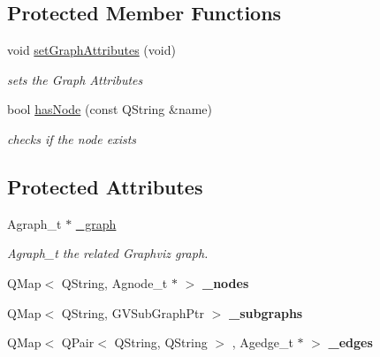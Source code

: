 \subsection*{\-Protected \-Member \-Functions}
\begin{DoxyCompactItemize}
\item 
\hypertarget{class_g_v_sub_graph_a6f94775bfde0ef47c59df8a7e6510aaf}{void \hyperlink{class_g_v_sub_graph_a6f94775bfde0ef47c59df8a7e6510aaf}{set\-Graph\-Attributes} (void)}\label{class_g_v_sub_graph_a6f94775bfde0ef47c59df8a7e6510aaf}

\begin{DoxyCompactList}\small\item\em sets the \-Graph \-Attributes \end{DoxyCompactList}\item 
bool \hyperlink{class_g_v_sub_graph_af55511f05fe4d65e122cc77c2d02a706}{has\-Node} (const \-Q\-String \&name)
\begin{DoxyCompactList}\small\item\em checks if the node exists \end{DoxyCompactList}\end{DoxyCompactItemize}
\subsection*{\-Protected \-Attributes}
\begin{DoxyCompactItemize}
\item 
\hypertarget{class_g_v_sub_graph_ae9ba380851ecbc611bbe9cd2980ba152}{\-Agraph\-\_\-t $\ast$ \hyperlink{class_g_v_sub_graph_ae9ba380851ecbc611bbe9cd2980ba152}{\-\_\-graph}}\label{class_g_v_sub_graph_ae9ba380851ecbc611bbe9cd2980ba152}

\begin{DoxyCompactList}\small\item\em \-Agraph\-\_\-t the related \-Graphviz graph. \end{DoxyCompactList}\item 
\hypertarget{class_g_v_sub_graph_ab994dac998f44c0566567d9cf28c5aae}{\-Q\-Map$<$ \-Q\-String, \-Agnode\-\_\-t $\ast$ $>$ {\bfseries \-\_\-nodes}}\label{class_g_v_sub_graph_ab994dac998f44c0566567d9cf28c5aae}

\item 
\hypertarget{class_g_v_sub_graph_a4bfd077344f6c2c530bb614b347ee7e0}{\-Q\-Map$<$ \-Q\-String, \-G\-V\-Sub\-Graph\-Ptr $>$ {\bfseries \-\_\-subgraphs}}\label{class_g_v_sub_graph_a4bfd077344f6c2c530bb614b347ee7e0}

\item 
\hypertarget{class_g_v_sub_graph_af3e72648f3a35641ca27b948791e32ca}{\-Q\-Map$<$ \-Q\-Pair$<$ \-Q\-String, \-Q\-String $>$\*
, \-Agedge\-\_\-t $\ast$ $>$ {\bfseries \-\_\-edges}}\label{class_g_v_sub_graph_af3e72648f3a35641ca27b948791e32ca}

\end{DoxyCompactItemize}


